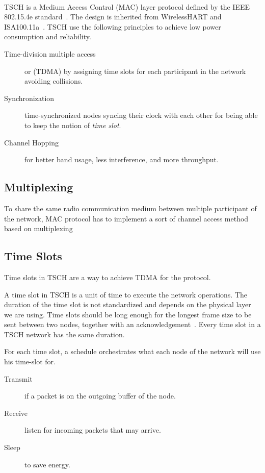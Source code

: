 \paragraph{}

TSCH is a Medium Access Control (MAC) layer protocol defined by the IEEE
802.15.4e standard~\cite{rfc7554}.
The design is inherited from WirelessHART and
ISA100.11a~\cite{Duquennoy2017TSCHA6}.
TSCH use the following principles to achieve low power consumption and
reliability.

\begin{description}
  \item[Time-division multiple access] or (TDMA) by assigning time slots for each
    participant in the network avoiding collisions.
  \item[Synchronization] time-synchronized nodes syncing their clock with each
    other for being able to keep the notion of \emph{time slot}.
  \item[Channel Hopping] for better band usage, less interference, and more
    throughput.
\end{description}

\subsection{Multiplexing}

To share the same radio communication medium between multiple participant of
the network, MAC protocol has to implement a sort of channel access method
based on multiplexing


\subsection{Time Slots}

Time slots in TSCH are a way to achieve TDMA for the protocol.

A time slot in TSCH is a unit of time to execute the network operations.
The duration of the time slot is not standardized and depends on the physical
layer we are using.
Time slots should be long enough for the longest frame size to be sent
between two nodes, together with an acknowledgement~\cite{rfc7554}.
Every time slot in a TSCH network has the same duration.

For each time slot, a schedule orchestrates what each
node of the network will use his time-slot for.

\begin{description}
  \item [Transmit] if a packet is on the outgoing buffer of the node.
  \item [Receive] listen for incoming packets that may arrive.
  \item [Sleep] to save energy.
\end{description}

